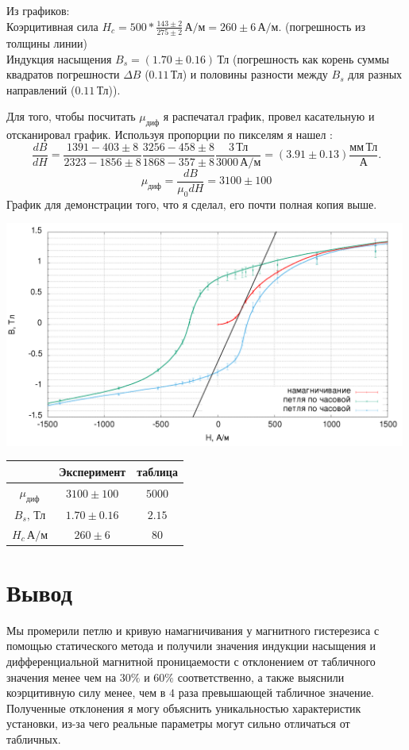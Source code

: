 \documentclass[a4paper]{article}
\begin{document}
\begin{enumerate}
Из графиков:\\
Коэрцитивная сила $H_{c}=500*\frac{143\pm2}{275\pm2}\,\text{А}/\text{м} = 260\pm6\,\text{А}/\text{м}.$ (погрешность из толщины линии)\\
Индукция насыщения $B_s = (1.70\pm0.16)\,\text{Тл}$ (погрешность как корень суммы квадратов погрешности $\Delta B$ ($0.11\,\text{Тл}$) и половины разности между $B_s$ для разных направлений ($0.11\,\text{Тл}$)).

Для того, чтобы посчитать $\mu_\text{диф}$ я распечатал график, провел касательную и отсканировал график. Используя пропорции по пикселям я нашел :
$$\frac{dB}{dH} = \frac{1391-403\pm8}{2323-1856\pm8}\frac{3256-458\pm8}{1868-357\pm8}\frac{3\,\text{Тл}}{3000\,\text{А}/\text{м}} = (3.91\pm0.13) \frac{\text{мм}\,\text{Тл}}{\text{А}}.$$
$$\mu_\text{диф} = \frac{dB}{\mu_0dH} = 3100\pm100$$
График для демонстрации того, что я сделал, его почти полная копия выше.
\begin{center}
\includegraphics[width=0.99\textwidth]{6_res.png}
\end{center}

\end{enumerate}

\begin{center}
\begin{tabular}{|c|c|c|}
\hline
&Эксперимент&таблица\\\hline
$\mu_\text{диф}$&$3100\pm100$&$5000$\\\hline
$B_s,\,\text{Тл}$&$1.70\pm0.16$&$2.15$\\\hline
$H_{c}\,\text{А}/\text{м}$&$260\pm6$&$80$\\\hline
\end{tabular}
\end{center}
\section{Вывод}
Мы промерили петлю и кривую намагничивания у магнитного гистерезиса с помощью статического метода и получили значения индукции насыщения и дифференциальной магнитной проницаемости с отклонением от табличного значения менее чем на $30\%$ и $60\%$ соответственно, а также выяснили коэрцитивную силу менее, чем в $4$ раза превышающей табличное значение. Полученные отклонения я могу объяснить уникальностью характеристик установки, из-за чего реальные параметры могут сильно отличаться от табличных.
\end{document}
